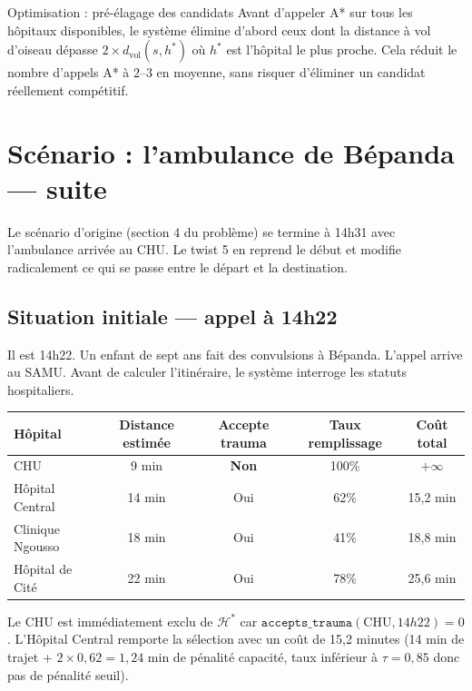 \documentclass[12pt,a4paper]{article}
\theoremstyle{definition}
\theoremstyle{remark}
\begin{document}
\begin{metierbox}{Optimisation : pré-élagage des candidats}
Avant d'appeler A* sur tous les hôpitaux disponibles, le système
élimine d'abord ceux dont la distance à vol d'oiseau dépasse
$2 \times d_{\text{vol}}(s, h^*)$ où $h^*$ est l'hôpital le plus
proche. Cela réduit le nombre d'appels A* à $2$--$3$ en moyenne,
sans risquer d'éliminer un candidat réellement compétitif.
\end{metierbox}

\newpage

\section{Scénario : l'ambulance de Bépanda — suite}

Le scénario d'origine (section 4 du problème) se termine à 14h31 avec
l'ambulance arrivée au CHU. Le twist 5 en reprend le début et modifie
radicalement ce qui se passe entre le départ et la destination.

\subsection{Situation initiale — appel à 14h22}

Il est 14h22. Un enfant de sept ans fait des convulsions à Bépanda.
L'appel arrive au SAMU. Avant de calculer l'itinéraire, le système
interroge les statuts hospitaliers.

\medskip
\begin{center}
\begin{tabular}{lcccc}
  \toprule
  \textbf{Hôpital} & \textbf{Distance estimée} &
  \textbf{Accepte trauma} & \textbf{Taux remplissage} & \textbf{Coût total} \\
  \midrule
  CHU            & 9 min  & \textbf{Non} & 100\% & $+\infty$ \\
  Hôpital Central & 14 min & Oui         & 62\%  & 15,2 min  \\
  Clinique Ngousso & 18 min & Oui         & 41\%  & 18,8 min  \\
  Hôpital de Cité & 22 min & Oui         & 78\%  & 25,6 min  \\
  \bottomrule
\end{tabular}
\end{center}
\medskip

\noindent
Le CHU est immédiatement exclu de $\mathcal{H}^*$ car
$\texttt{accepts\_trauma}(\text{CHU}, 14h22) = 0$.
L'Hôpital Central remporte la sélection avec un coût de 15,2 minutes
(14 min de trajet + $2 \times 0{,}62 = 1{,}24$ min de pénalité capacité,
taux inférieur à $\tau = 0{,}85$ donc pas de pénalité seuil).
\end{document}
